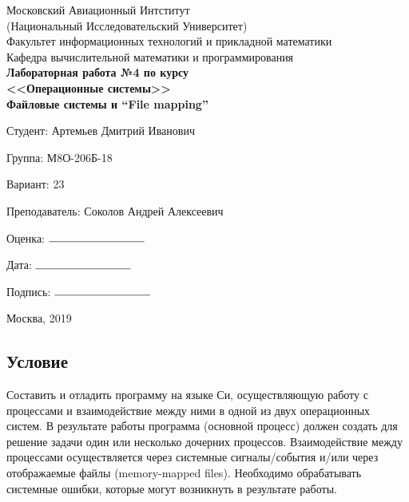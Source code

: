 \documentclass[12pt]{article}
\begin{document}
\begin{titlepage}
  \large
  \begin{center} 
    
      Московский Авиационный Интститут \\
      (Национальный Исследовательский Университет) \\
      Факультет информационных технологий и прикладной математики \\
      Кафедра вычислительной математики и программирования \\
      \vfill\vfill
      \textbf{
        { Лабораторная работа №4 по курсу} \\ 
        <<Операционные системы>> \\
        \bigskip
            {Файловые системы и ``File mapping'' } \\
    } 
  \end{center}
  \vfill

  \begin{flushright}

    Студент:  {Артемьев Дмитрий Иванович}

    Группа: {М8О-206Б-18}

    Вариант: {23}
    
    Преподаватель: {Соколов Андрей Алексеевич}

    Оценка: $\rule{3cm}{0.15mm}$

    Дата: $\rule{3cm}{0.15mm}$
    
    Подпись: $\rule{3cm}{0.15mm}$

  \end{flushright}
  \vfill
  \begin{center}
    Москва, 2019
  \end{center}
  
\end{titlepage}

\subsection*{Условие}

Составить и отладить программу на языке Си, осуществляющую работу с процессами и
взаимодействие между ними в одной из двух операционных систем. В результате работы
программа (основной процесс) должен создать для решение задачи один или несколько
дочерних процессов. Взаимодействие между процессами осуществляется через системные
сигналы/события и/или через отображаемые файлы (memory-mapped files).
Необходимо обрабатывать системные ошибки, которые могут возникнуть в результате работы.
\end{document}
